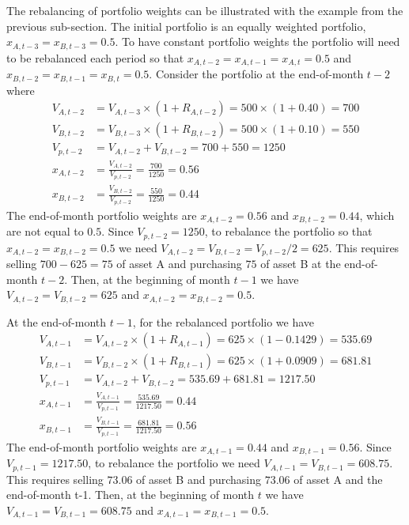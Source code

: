 \documentclass[
  letterpaper,
  DIV=11,
  numbers=noendperiod]{scrreprt}
\theoremstyle{definition}
\theoremstyle{definition}
\theoremstyle{remark}
\begin{document}
The rebalancing of portfolio weights can be illustrated with the example
from the previous sub-section. The initial portfolio is an equally
weighted portfolio, \(x_{A,t-3} = x_{B,t-3} = 0.5\). To have constant
portfolio weights the portfolio will need to be rebalanced each period
so that \(x_{A,t-2} = x_{A,t-1} = x_{A,t} = 0.5\) and
\(x_{B,t-2} = x_{B,t-1} = x_{B,t} = 0.5\). Consider the portfolio at the
end-of-month \(t-2\) where \begin{align}
V_{A,t-2} &= V_{A,t-3}\times (1 + R_{A,t-2}) = 500 \times (1 + 0.40) = 700 \\
V_{B,t-2} &= V_{B,t-3}\times (1 + R_{B,t-2}) = 500 \times (1 + 0.10) = 550 \\
V_{p,t-2} &= V_{A,t-2} + V_{B,t-2} = 700 + 550 = 1250 \\
x_{A,t-2} &= \frac{V_{A,t-2}}{V_{p,t-2}} = \frac{700}{1250} = 0.56 \\
x_{B,t-2} &= \frac{V_{B,t-2}}{V_{p,t-2}} = \frac{550}{1250} = 0.44 
\end{align} The end-of-month portfolio weights are \(x_{A,t-2} = 0.56\)
and \(x_{B,t-2} = 0.44\), which are not equal to \(0.5\). Since
\(V_{p,t-2} = 1250\), to rebalance the portfolio so that
\(x_{A,t-2} = x_{B,t-2} = 0.5\) we need
\(V_{A,t-2} = V_{B,t-2} = V_{p,t-2}/2 = 625\). This requires selling
\(700 - 625 = 75\) of asset A and purchasing \(75\) of asset B at the
end-of-month \(t-2\). Then, at the beginning of month \(t-1\) we have
\(V_{A,t-2} = V_{B,t-2} = 625\) and \(x_{A,t-2} = x_{B,t-2} = 0.5\).

At the end-of-month \(t-1\), for the rebalanced portfolio we have
\begin{align}
V_{A,t-1} &= V_{A,t-2}\times (1 + R_{A,t-1}) = 625 \times (1 - 0.1429) = 535.69 \\
V_{B,t-1} &= V_{B,t-2}\times (1 + R_{B,t-1}) = 625 \times (1 + 0.0909) = 681.81 \\
V_{p,t-1} &= V_{A,t-2} + V_{B,t-2} = 535.69 + 681.81 = 1217.50 \\
x_{A,t-1} &= \frac{V_{A,t-1}}{V_{p,t-1}} = \frac{535.69}{1217.50} = 0.44 \\
x_{B,t-1} &= \frac{V_{B,t-1}}{V_{p,t-1}} = \frac{681.81}{1217.50} = 0.56 
\end{align} The end-of-month portfolio weights are \(x_{A,t-1} = 0.44\)
and \(x_{B,t-1} = 0.56\). Since \(V_{p,t-1} = 1217.50\), to rebalance
the portfolio we need \(V_{A,t-1} = V_{B,t-1} = 608.75\). This requires
selling \(73.06\) of asset B and purchasing \(73.06\) of asset A and the
end-of-month t-1. Then, at the beginning of month \(t\) we have
\(V_{A,t-1} = V_{B,t-1} = 608.75\) and \(x_{A,t-1} = x_{B,t-1} = 0.5\).
\end{document}
